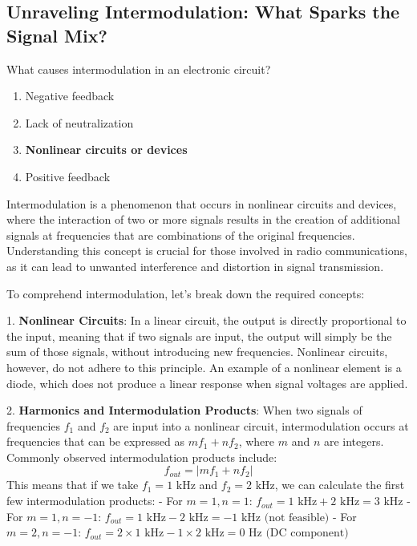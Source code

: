 \subsection{Unraveling Intermodulation: What Sparks the Signal Mix?}

\begin{tcolorbox}[colback=gray!10, colframe=black, title=E4D08]

What causes intermodulation in an electronic circuit?

\begin{enumerate}[label=\Alph*.]
    \item Negative feedback
    \item Lack of neutralization
    \item \textbf{Nonlinear circuits or devices}
    \item Positive feedback
\end{enumerate} \end{tcolorbox}

Intermodulation is a phenomenon that occurs in nonlinear circuits and devices, where the interaction of two or more signals results in the creation of additional signals at frequencies that are combinations of the original frequencies. Understanding this concept is crucial for those involved in radio communications, as it can lead to unwanted interference and distortion in signal transmission.

To comprehend intermodulation, let's break down the required concepts:

1. \textbf{Nonlinear Circuits}: In a linear circuit, the output is directly proportional to the input, meaning that if two signals are input, the output will simply be the sum of those signals, without introducing new frequencies. Nonlinear circuits, however, do not adhere to this principle. An example of a nonlinear element is a diode, which does not produce a linear response when signal voltages are applied.

2. \textbf{Harmonics and Intermodulation Products}: When two signals of frequencies \(f_1\) and \(f_2\) are input into a nonlinear circuit, intermodulation occurs at frequencies that can be expressed as \(mf_1 + nf_2\), where \(m\) and \(n\) are integers. Commonly observed intermodulation products include:
   \[
   f_{out} = |mf_1 + nf_2|
   \]
   This means that if we take \(f_1 = 1 \text{ kHz}\) and \(f_2 = 2 \text{ kHz}\), we can calculate the first few intermodulation products:
   - For \(m=1, n=1\): \(f_{out} = 1 \text{ kHz} + 2 \text{ kHz} = 3 \text{ kHz}\)
   - For \(m=1, n=-1\): \(f_{out} = 1 \text{ kHz} - 2 \text{ kHz} = -1 \text{ kHz} \text{ (not feasible)}\)
   - For \(m=2, n=-1\): \(f_{out} = 2 \times 1 \text{ kHz} - 1 \times 2 \text{ kHz} = 0 \text{ Hz} \text{ (DC component)}\)

